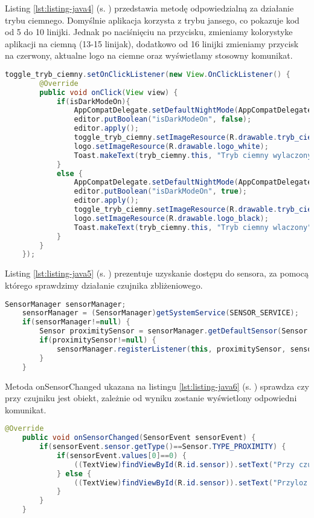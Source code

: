  Listing \ref{lst:listing-java4} (s. \pageref{lst:listing-java4}) przedstawia metodę odpowiedzialną za działanie trybu ciemnego. Domyślnie aplikacja korzysta z trybu jansego, co pokazuje kod od 5 do 10 linijki. Jednak po naciśnięciu na przycisku, zmieniamy kolorystyke aplikacji na ciemną (13-15 linijak), dodatkowo od 16 linijki zmieniamy przycisk na czerwony, aktualne logo na ciemne oraz wyświetlamy stosowny komunikat.
\begin{lstlisting}[caption=Tryb Ciemny - Włączenie/wyłączenie trybu ciemnego, label={lst:listing-java4}, language=Java]
	toggle_tryb_ciemny.setOnClickListener(new View.OnClickListener() {
		@Override
		public void onClick(View view) {
			if(isDarkModeOn){
				AppCompatDelegate.setDefaultNightMode(AppCompatDelegate.MODE_NIGHT_NO);
				editor.putBoolean("isDarkModeOn", false);
				editor.apply();
				toggle_tryb_ciemny.setImageResource(R.drawable.tryb_ciemny_off);
				logo.setImageResource(R.drawable.logo_white);
				Toast.makeText(tryb_ciemny.this, "Tryb ciemny wylaczony", Toast.LENGTH_SHORT).show();
			}
			else {
				AppCompatDelegate.setDefaultNightMode(AppCompatDelegate.MODE_NIGHT_YES);
				editor.putBoolean("isDarkModeOn", true);
				editor.apply();
				toggle_tryb_ciemny.setImageResource(R.drawable.tryb_ciemny_on);
				logo.setImageResource(R.drawable.logo_black);
				Toast.makeText(tryb_ciemny.this, "Tryb ciemny wlaczony", Toast.LENGTH_SHORT).show();
			}
		}
	});
\end{lstlisting}

\newpage


Listing \ref{lst:listing-java5} (s. \pageref{lst:listing-java5}) prezentuje uzyskanie dostępu do sensora, za pomocą którego sprawdzimy działanie czujnika zbliżeniowego.
\begin{lstlisting}[caption=Czujnik Zbliżeniowy - Dostęp do czujnika, label={lst:listing-java5}, language=Java]
	SensorManager sensorManager;
	sensorManager = (SensorManager)getSystemService(SENSOR_SERVICE);
	if(sensorManager!=null) {
		Sensor proximitySensor = sensorManager.getDefaultSensor(Sensor.TYPE_PROXIMITY);
		if(proximitySensor!=null) {
			sensorManager.registerListener(this, proximitySensor, sensorManager.SENSOR_DELAY_NORMAL);
		}
	}
\end{lstlisting}


Metoda onSensorChanged ukazana na listingu \ref{lst:listing-java6} (s. \pageref{lst:listing-java6}) sprawdza czy przy czujniku jest obiekt, zależnie od wyniku zostanie wyświetlony odpowiedni komunikat.
\begin{lstlisting}[caption=Czujnik Zbliżeniowy - Działanie, label={lst:listing-java6}, language=Java]
	@Override
	public void onSensorChanged(SensorEvent sensorEvent) {
		if(sensorEvent.sensor.getType()==Sensor.TYPE_PROXIMITY) {
			if(sensorEvent.values[0]==0) {
				((TextView)findViewById(R.id.sensor)).setText("Przy czujniku jest obiekt");
			} else {
				((TextView)findViewById(R.id.sensor)).setText("Przyloz obiekt do czujnika");
			}
		}
	}
\end{lstlisting}


